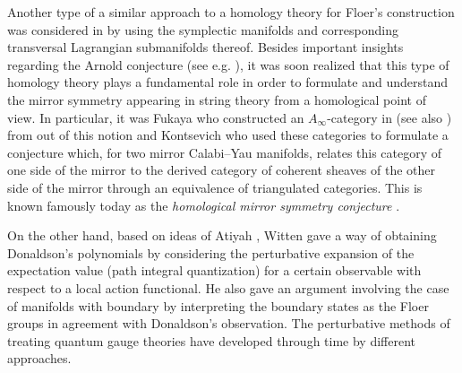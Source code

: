 \documentclass[11pt,colorinlistoftodos]{amsart}
\numberwithin{equation}{subsection}
\theoremstyle{plain}
\theoremstyle{definition}
\theoremstyle{remark}
\begin{document}
Another type of a similar approach to a homology theory for Floer's construction was considered in \cite{Floer1988b} by using the symplectic manifolds and corresponding transversal Lagrangian submanifolds thereof. Besides important insights regarding the Arnold conjecture (see e.g. \cite{HoferZehnder1994}), it was soon realized that this type of homology theory plays a fundamental role in order to formulate and understand the mirror symmetry appearing in string theory \cite{Yau1992,HZKKTVPV2003} from a homological point of view. In particular, it was Fukaya who constructed an $A_\infty$-category in \cite{Fukaya1993} (see also \cite{FukayaOhOhtaOno2009_1,FukayaOhOhtaOno2009_2}) from out of this notion and Kontsevich who used these categories to formulate a conjecture which, for two mirror Calabi--Yau manifolds, relates this category of one side of the mirror to the derived category of coherent sheaves of the other side of the mirror through an equivalence of triangulated categories. This is known famously today as the \emph{homological mirror symmetry conjecture} \cite{Kontsevich1994_2}. 

On the other hand, based on ideas of Atiyah \cite{Atiyah1987}, Witten gave a way of obtaining Donaldson's polynomials by considering the perturbative expansion of the expectation value (path integral quantization) for a certain observable with respect to a local action functional. He also gave an argument involving the case of manifolds with boundary by interpreting the boundary states as the Floer groups in agreement with Donaldson's observation. 
The perturbative methods of treating quantum gauge theories have developed through time by different approaches. 
\end{document}
